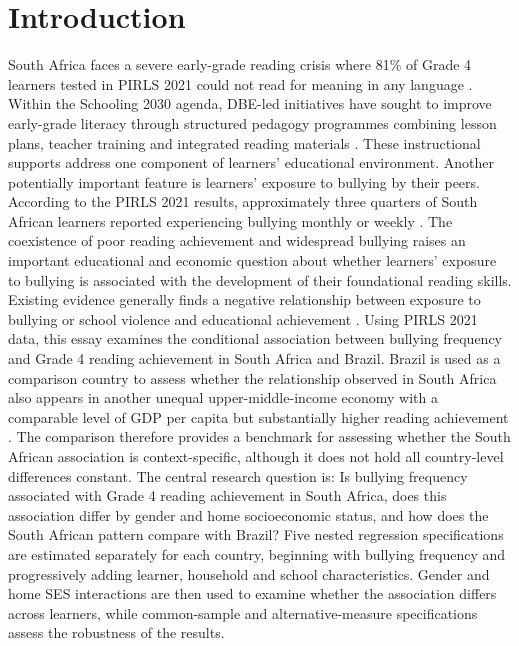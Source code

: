 \section{Introduction}

South Africa faces a severe early-grade reading crisis where 81\% of Grade 4 learners tested in PIRLS 2021 could not read for meaning in any language \citep{spaull2023pirls}. Within the Schooling 2030 agenda, DBE-led initiatives have sought to improve early-grade literacy through structured pedagogy programmes combining lesson plans, teacher training and integrated reading materials \citep{dbe_egrs}. These instructional supports address one component of learners’ educational environment. Another potentially important feature is learners’ exposure to bullying by their peers. According to the PIRLS 2021 results, approximately three quarters of South African learners reported experiencing bullying monthly or weekly \citep{mullis2023pirls}. The coexistence of poor reading achievement and widespread bullying raises an important educational and economic question about whether learners’ exposure to bullying is associated with the development of their foundational reading skills.
 Existing evidence generally finds a negative relationship between exposure to bullying or school violence and educational achievement \citep{anton_erxleben2016bullying, ozyildirim2024effect}. Using PIRLS 2021 data, this essay examines the conditional association between bullying frequency and Grade 4 reading achievement in South Africa and Brazil. Brazil is used as a comparison country to assess whether the relationship observed in South Africa also appears in another unequal upper-middle-income economy with a comparable level of GDP per capita but substantially higher reading achievement \citep{de2023comparative, spaull2023pirls}. The comparison therefore provides a benchmark for assessing whether the South African association is context-specific, although it does not hold all country-level differences constant. The central research question is: Is bullying frequency associated with Grade 4 reading achievement in South Africa, does this association differ by gender and home socioeconomic status, and how does the South African pattern compare with Brazil?
 Five nested regression specifications are estimated separately for each country, beginning with bullying frequency and progressively adding learner, household and school characteristics. Gender and home SES interactions are then used to examine whether the association differs across learners, while common-sample and alternative-measure specifications assess the robustness of the results. 
